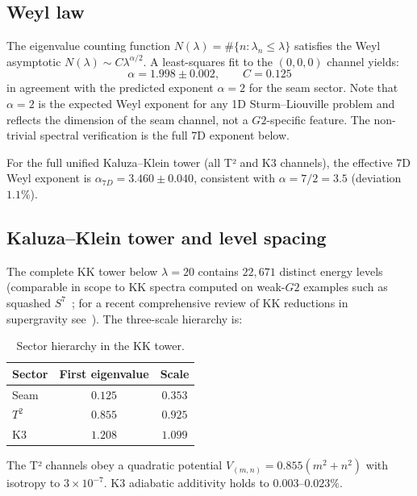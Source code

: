 \documentclass[11pt,a4paper]{article}
\newcommand{\Gtwo}{\mathrm{G}_2}
\def\Gtwo{G2}%
\begin{document}
\subsection{Weyl law}

The eigenvalue counting function $N(\lambda) = \#\{n : \lambda_n \leq \lambda\}$ satisfies the Weyl asymptotic $N(\lambda) \sim C \lambda^{\alpha/2}$. A least-squares fit to the $(0,0,0)$ channel yields:
\begin{equation}
\alpha = 1.998 \pm 0.002, \qquad C = 0.125
\end{equation}
in agreement with the predicted exponent $\alpha = 2$ for the seam sector. Note that $\alpha = 2$ is the expected Weyl exponent for any 1D Sturm--Liouville problem and reflects the dimension of the seam channel, not a $\Gtwo$-specific feature. The non-trivial spectral verification is the full 7D exponent below.

For the full unified Kaluza--Klein tower (all T² and K3 channels), the effective 7D Weyl exponent is $\alpha_{7D} = 3.460 \pm 0.040$, consistent with $\alpha = 7/2 = 3.5$ (deviation $1.1\%$).

\subsection{Kaluza--Klein tower and level spacing}

The complete KK tower below $\lambda = 20$ contains $22{,}671$ distinct energy levels (comparable in scope to KK spectra computed on weak-$\Gtwo$ examples such as squashed $S^7$~\cite{Nilsson2024}; for a recent comprehensive review of KK reductions in supergravity see~\cite{DuffNilssonPope2025}). The three-scale hierarchy is:
\begin{table}[ht]
\centering
\begin{tabular}{lcc}
\toprule
Sector & First eigenvalue & Scale \\
\midrule
Seam & $0.125$ & $0.353$ \\
$T^2$ & $0.855$ & $0.925$ \\
K3 & $1.208$ & $1.099$ \\
\bottomrule
\end{tabular}
\caption{Sector hierarchy in the KK tower.}
\label{tab:sectors}
\end{table}

The T² channels obey a quadratic potential $V_{(m,n)} = 0.855(m^2 + n^2)$ with isotropy to $3 \times 10^{-7}$. K3 adiabatic additivity holds to $0.003$--$0.023\%$.
\end{document}
